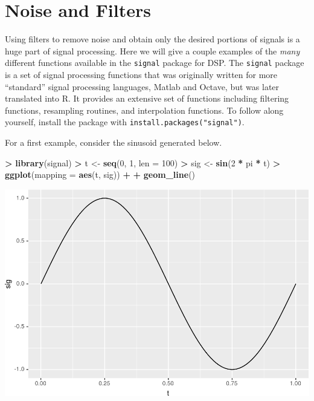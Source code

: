 \documentclass[]{krantz}
\makeatletter
\newenvironment{Shaded}{\begin{snugshade}}{\end{snugshade}}
\newcommand{\DataTypeTok}[1]{\textcolor[rgb]{0.27,0.27,0.27}{#1}}
\newcommand{\DecValTok}[1]{\textcolor[rgb]{0.06,0.06,0.06}{#1}}
\newcommand{\KeywordTok}[1]{\textcolor[rgb]{0.27,0.27,0.27}{\textbf{#1}}}
\newcommand{\NormalTok}[1]{#1}
\newcommand{\OperatorTok}[1]{\textcolor[rgb]{0.43,0.43,0.43}{\textbf{#1}}}
\newcommand{\StringTok}[1]{\textcolor[rgb]{0.5,0.5,0.5}{#1}}
\newenvironment{kframe}{%
\medskip{}
\setlength{\fboxsep}{.8em}
 \def\at@end@of@kframe{}%
 \ifinner\ifhmode%
  \def\at@end@of@kframe{\end{minipage}}%
  \begin{minipage}{\columnwidth}%
 \fi\fi%
 \def\FrameCommand##1{\hskip\@totalleftmargin \hskip-\fboxsep
 \colorbox{shadecolor}{##1}\hskip-\fboxsep
     \hskip-\linewidth \hskip-\@totalleftmargin \hskip\columnwidth}%
 \MakeFramed {\advance\hsize-\width
   \@totalleftmargin\z@ \linewidth\hsize
   \@setminipage}}%
 {\par\unskip\endMakeFramed%
 \at@end@of@kframe}
\renewenvironment{Shaded}{\begin{kframe}}{\end{kframe}}
\makeatother
\begin{document}
\hypertarget{noise-and-filters}{%
\section{Noise and Filters}\label{noise-and-filters}}

Using filters to remove noise and obtain only the desired portions of signals is a huge part of signal processing. Here we will give a couple examples of the \emph{many} different functions available in the \texttt{signal} package for DSP. The \texttt{signal} package is a set of signal processing functions that was originally written for more ``standard'' signal processing languages, Matlab and Octave, but was later translated into R. It provides an extensive set of functions including filtering functions, resampling routines, and interpolation functions. To follow along yourself, install the package with \texttt{install.packages("signal")}.

For a first example, consider the sinusoid generated below.

\begin{Shaded}
\begin{Highlighting}[]
\OperatorTok{>}\StringTok{ }\KeywordTok{library}\NormalTok{(signal)}
\OperatorTok{>}\StringTok{ }\NormalTok{t <-}\StringTok{ }\KeywordTok{seq}\NormalTok{(}\DecValTok{0}\NormalTok{, }\DecValTok{1}\NormalTok{, }\DataTypeTok{len =} \DecValTok{100}\NormalTok{)}
\OperatorTok{>}\StringTok{ }\NormalTok{sig <-}\StringTok{ }\KeywordTok{sin}\NormalTok{(}\DecValTok{2} \OperatorTok{*}\StringTok{ }\NormalTok{pi }\OperatorTok{*}\StringTok{ }\NormalTok{t)}
\OperatorTok{>}\StringTok{ }\KeywordTok{ggplot}\NormalTok{(}\DataTypeTok{mapping =} \KeywordTok{aes}\NormalTok{(t, sig)) }\OperatorTok{+}\StringTok{ }
\OperatorTok{+}\StringTok{   }\KeywordTok{geom_line}\NormalTok{()}
\end{Highlighting}
\end{Shaded}

\includegraphics{bookdown_files/figure-latex/unnamed-chunk-309-1.pdf}
\end{document}
